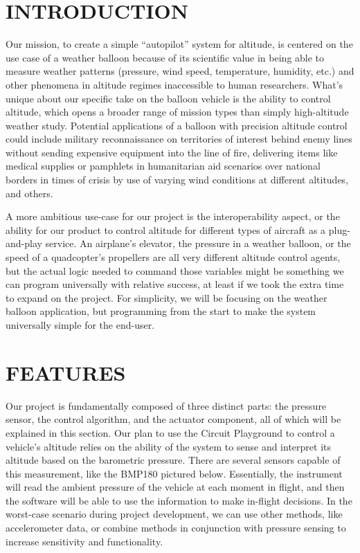 \documentclass[12pt]{article}
\begin{document}
\section{INTRODUCTION}
Our mission, to create a simple “autopilot” system for altitude, is centered on the use case of a weather balloon because of its scientific value in being able to measure weather patterns (pressure, wind speed, temperature, humidity, etc.) and other phenomena in altitude regimes inaccessible to human researchers. What’s unique about our specific take on the balloon vehicle is the ability to control altitude, which opens a broader range of mission types than simply high-altitude weather study. Potential applications of a balloon with precision altitude control could include military reconnaissance on territories of interest behind enemy lines without sending expensive equipment into the line of fire, delivering items like medical supplies or pamphlets in humanitarian aid scenarios over national borders in times of crisis by use of varying wind conditions at different altitudes, and others. 

A more ambitious use-case for our project is the interoperability aspect, or the ability for our product to control altitude for different types of aircraft as a plug-and-play service. An airplane’s elevator, the pressure in a weather balloon, or the speed of a quadcopter’s propellers are all very different altitude control agents, but the actual logic needed to command those variables might be something we can program universally with relative success, at least if we took the extra time to expand on the project. For simplicity, we will be focusing on the weather balloon application, but programming from the start to make the system universally simple for the end-user.  

\section{FEATURES}
Our project is fundamentally composed of three distinct parts: the pressure sensor, the control algorithm, and the actuator component, all of which will be explained in this section. Our plan to use the Circuit Playground to control a vehicle’s altitude relies on the ability of the system to sense and interpret its altitude based on the barometric pressure. There are several sensors capable of this measurement, like the BMP180 pictured below. Essentially, the instrument will read the ambient pressure of the vehicle at each moment in flight, and then the software will be able to use the information to make in-flight decisions. In the worst-case scenario during project development, we can use other methods, like accelerometer data, or combine methods in conjunction with pressure sensing to increase sensitivity and functionality. 
\end{document}
